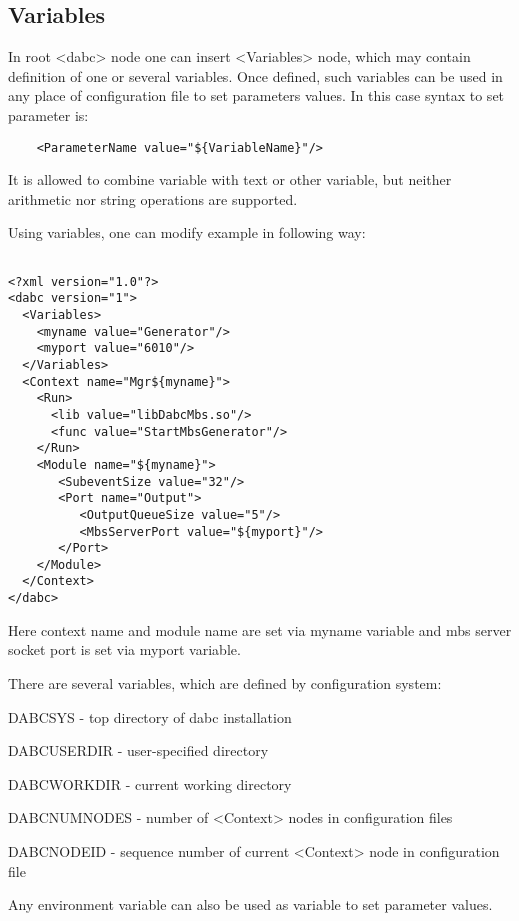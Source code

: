 \subsection{Variables}

In root <dabc> node one can insert <Variables> node, which may contain 
definition of one or several variables. Once defined, 
such variables can be used in any place of configuration file to set parameters values.
In this case syntax to set parameter is:

\begin{verbatim}
    <ParameterName value="${VariableName}"/>
\end{verbatim}

It is allowed to combine variable with text or other variable, 
but neither arithmetic nor string operations are supported. 

Using variables, one can modify example in following way:

\begin{verbatim}

<?xml version="1.0"?>
<dabc version="1">
  <Variables>
    <myname value="Generator"/> 
    <myport value="6010"/> 
  </Variables>
  <Context name="Mgr${myname}">
    <Run>
      <lib value="libDabcMbs.so"/>
      <func value="StartMbsGenerator"/>
    </Run>
    <Module name="${myname}">
       <SubeventSize value="32"/>
       <Port name="Output">
          <OutputQueueSize value="5"/>
          <MbsServerPort value="${myport}"/>
       </Port>
    </Module>
  </Context>
</dabc>

\end{verbatim}

Here context name and module name are set via myname variable and mbs server 
socket port is set via myport variable.

There are several variables, which are defined by configuration system:

\bbul
\item DABCSYS - top directory of dabc installation
\item DABCUSERDIR - user-specified directory
\item DABCWORKDIR - current working directory
\item DABCNUMNODES - number of <Context> nodes in configuration files
\item DABCNODEID - sequence number of current <Context> node in configuration file 
\ebul

Any environment variable can also be used as variable to set parameter values. 



